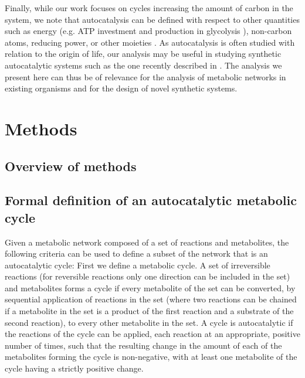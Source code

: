 Finally, while our work focuses on cycles increasing the amount of carbon in the system, we note that autocatalysis can be defined with respect to other quantities such as energy (e.g. ATP investment and production in glycolysis \cite{Teusink1998-he}), non-carbon atoms, reducing power, or other moieties \cite{Reich1981-qd}.
  As autocatalysis is often studied with relation to the origin of life, our analysis may be useful in studying synthetic autocatalytic systems such as the one recently described in \cite{Semenov2016-ol}.
  The analysis we present here can thus be of relevance for the analysis of metabolic networks in existing organisms and for the design of novel synthetic systems.

  \clearpage
  \section{Methods}
  \subsection*{Overview of methods}
    \renewcommand\thesubsection{\arabic{subsection}}
\renewcommand\stifont{\normalfont\small}
  \secttoc
  \subsection{Formal definition of an autocatalytic metabolic cycle}
  \label{sec:formaldefautocatal}
  Given a metabolic network composed of a set of reactions and metabolites, the following criteria can be used to define a subset of the network that is an autocatalytic cycle:
  First we define a metabolic cycle.
A set of irreversible reactions (for reversible reactions only one direction can be included in the set) and metabolites forms a cycle if every metabolite of the set can be converted, by sequential application of reactions in the set (where two reactions can be chained if a metabolite in the set is a product of the first reaction and a substrate of the second reaction), to every other metabolite in the set.
A cycle is autocatalytic if the reactions of the cycle can be applied, each reaction at an appropriate, positive number of times, such that the resulting change in the amount of each of the metabolites forming the cycle is non-negative, with at least one metabolite of the cycle having a strictly positive change.

